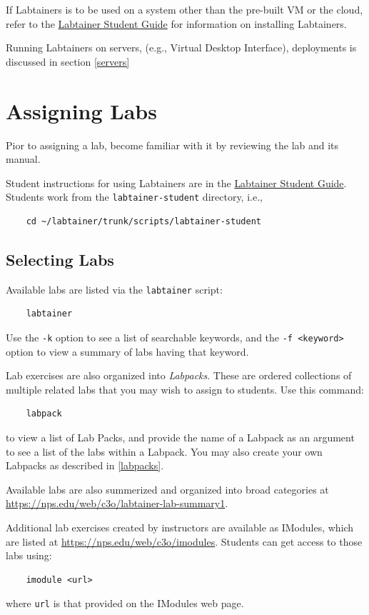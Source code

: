 \documentclass[12pt]{article}
\begin{document}
If Labtainers is to be used on a system other than the pre-built VM or the cloud,
refer to the \underline{Labtainer Student Guide} for information on
installing Labtainers.

Running Labtainers on servers, (e.g., Virtual Desktop Interface), deployments is discussed in
section \ref{servers}

\section{Assigning Labs}
Pior to assigning a lab, become familiar with it by reviewing the lab and its manual.

Student instructions for using Labtainers are in the \underline{Labtainer Student Guide}.  
Students work from the {\tt labtainer-student} directory, i.e.,
\begin{verbatim}
    cd ~/labtainer/trunk/scripts/labtainer-student
\end{verbatim}
\subsection{Selecting Labs}
Available labs are listed via the {\tt labtainer} script:
\begin{verbatim}
    labtainer
\end{verbatim}
\noindent Use the {\tt -k} option to see a list of searchable keywords, and the {\tt -f <keyword>} option to view a summary
of labs having that keyword.

Lab exercises are also organized into \textit{Labpacks}. These are ordered collections of multiple related labs that you may
wish to assign to students.  Use this command:
\begin{verbatim}
    labpack
\end{verbatim}
\noindent to view a list of Lab Packs, and provide the name of a Labpack as an argument to see a list of the labs
within a Labpack.  You may also create your own Labpacks as described in \ref{labpacks}. 

Available labs are also summerized and organized into broad categories at \url{https://nps.edu/web/c3o/labtainer-lab-summary1}.

Additional lab exercises created by instructors are available as IModules, which are listed at \url{https://nps.edu/web/c3o/imodules}.
Students can get access to those labs using:
\begin{verbatim}
    imodule <url>
\end{verbatim}
\noindent where {\tt url} is that provided on the IModules web page.
\end{document}
